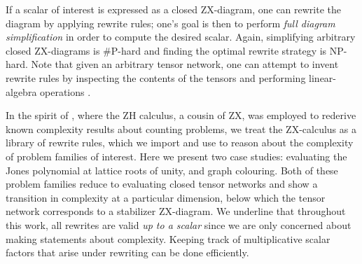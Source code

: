 If a scalar of interest is expressed as a closed ZX-diagram,
one can rewrite the diagram by applying rewrite rules; one's goal is then to perform \emph{full diagram simplification} in order to compute the desired scalar.
Again, simplifying arbitrary closed ZX-diagrams is \#P-hard and finding the optimal rewrite strategy is NP-hard.
Note that
given an arbitrary tensor network, one can attempt to invent rewrite rules by inspecting the contents of the tensors and performing linear-algebra operations \cite{gray2020hyperoptimized}.



In the spirit of \cite{debeaudrap2020tensor},
where the ZH calculus\cite{backens2018zh}, a cousin of ZX, was employed to rederive known complexity results about counting problems, we treat the ZX-calculus as a library of rewrite rules, which we import and use to reason about the complexity of problem families of interest.
Here we present two case studies: evaluating the Jones polynomial at lattice roots of unity, and graph colouring.
Both of these problem families reduce to evaluating
closed tensor networks and show a transition in complexity
at a particular dimension, below which the tensor network corresponds to a stabilizer ZX-diagram.
We underline that throughout this work, all rewrites are valid
\emph{up to a scalar}
since we are only concerned about making statements about complexity.
Keeping track of multiplicative scalar factors that arise under rewriting can be done efficiently.

